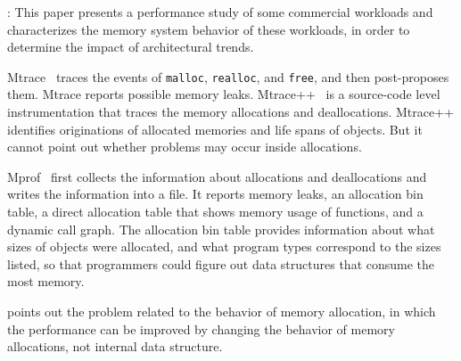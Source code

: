 
\cite{Barroso:1998:MSC:279358.279363}: This paper presents a performance study of some  commercial workloads and characterizes the memory system behavior of these workloads, in order to determine the impact of architectural trends.


Mtrace~\cite{mtrace} traces the events of \texttt{malloc}, \texttt{realloc}, and \texttt{free}, and then post-proposes them. Mtrace reports possible memory leaks. Mtrace++~\cite{Lee:2000:DMM:786772.787150} is a source-code level instrumentation that traces the memory allocations and deallocations. Mtrace++ identifies originations of allocated memories and life spans of objects. But it cannot point out whether problems may occur inside allocations. 

Mprof~\cite{Zorn:1988:MAP:894814} first collects the information about allocations and deallocations and writes the information into a file. It reports memory leaks, an allocation bin table, a direct allocation table that shows memory usage of functions, and a dynamic call graph. The allocation bin table provides information about what sizes of objects were allocated, and what program types correspond to the sizes listed, so that programmers could figure out data structures that consume the most memory. 

\MP{} points out the problem related to the behavior of memory allocation, in which the performance can be improved by changing the behavior of memory allocations, not internal data structure. 
  


\cite{846583}

